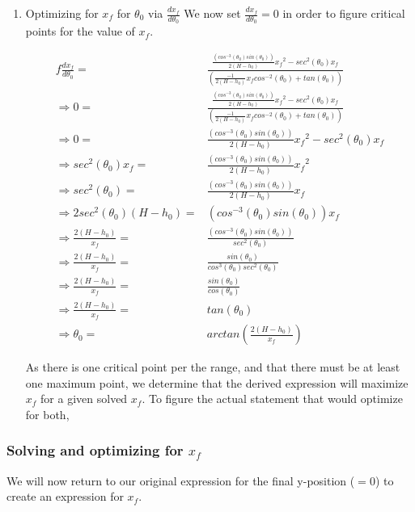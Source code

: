 \documentclass[11pt]{article}
\begin{document}
\begin{enumerate}
\item Optimizing for \(x_f\) for \(\theta_0\) via \(\frac{dx_f}{d\theta_0}\)
\label{sec:org8450c7b}
We now set \(\frac{dx_f}{d\theta_0}=0\) in order to figure critical points for the value of \(x_f\).

\begin{align}f
\frac{dx_f}{d\theta_0} =& \frac{\frac{(cos^{-3}(\theta_0) sin(\theta_0))}{2(H-h_0)} {x_f}^2  - sec^2(\theta_0) x_f }{(\frac{-1}{2(H-h_0)} {x_f} cos^{-2}(\theta_0) + tan(\theta_0))} \\
\Rightarrow 0 =& \frac{\frac{(cos^{-3}(\theta_0) sin(\theta_0))}{2(H-h_0)} {x_f}^2  - sec^2(\theta_0) x_f }{(\frac{-1}{2(H-h_0)} {x_f} cos^{-2}(\theta_0) + tan(\theta_0))} \\
\Rightarrow 0 =& \frac{(cos^{-3}(\theta_0) sin(\theta_0))}{2(H-h_0)} {x_f}^2  - sec^2(\theta_0) x_f \\
\Rightarrow sec^2(\theta_0) x_f =& \frac{(cos^{-3}(\theta_0) sin(\theta_0))}{2(H-h_0)} {x_f}^2 \\
\Rightarrow sec^2(\theta_0) =& \frac{(cos^{-3}(\theta_0) sin(\theta_0))}{2(H-h_0)} x_f \\
\Rightarrow 2sec^2(\theta_0)(H-h_0) =& (cos^{-3}(\theta_0) sin(\theta_0)) x_f \\
\Rightarrow \frac{2(H-h_0)}{x_f} =& \frac{(cos^{-3}(\theta_0) sin(\theta_0))}{sec^2(\theta_0)} \\
\Rightarrow \frac{2(H-h_0)}{x_f} =& \frac{sin(\theta_0)}{cos^3(\theta_0) sec^2(\theta_0)} \\
\Rightarrow \frac{2(H-h_0)}{x_f} =& \frac{sin(\theta_0)}{cos(\theta_0)} \\
\Rightarrow \frac{2(H-h_0)}{x_f} =& tan(\theta_0) \\
\Rightarrow \theta_0 =& arctan(\frac{2(H-h_0)}{x_f})
\end{align}

As there is one critical point per the range, and that there must be at least one maximum point, we determine that the derived expression will maximize \(x_f\) for a given solved \(x_f\). To figure the actual statement that would optimize for both,
\end{enumerate}

\subsubsection{Solving and optimizing for \(x_f\)}
\label{sec:org36f9896}
We will now return to our original expression for the final y-position (\(=0\)) to create an expression for \(x_f\).
\end{document}
